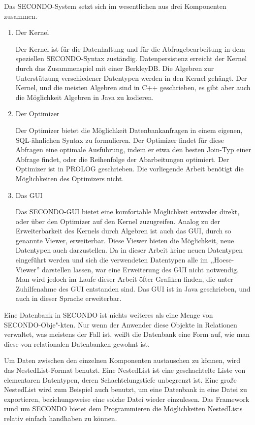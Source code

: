 Das SECONDO-System setzt sich im wesentlichen aus drei Komponenten zusammen.
\begin{enumerate}
\item Der Kernel

Der Kernel ist für die Datenhaltung und für die Abfragebearbeitung in dem speziellen SECONDO-Syntax zuständig. Datenpersistenz erreicht der Kernel durch das Zusammenspiel mit einer BerkleyDB. Die Algebren zur Unterstützung verschiedener Datentypen werden in den Kernel gehängt. Der Kernel, und die meisten Algebren sind in C++ geschrieben, es gibt aber auch die Möglichkeit Algebren in Java zu kodieren.

\item Der Optimizer

Der Optimizer bietet die Möglichkeit Datenbankanfragen in einem eigenen, SQL-ähnlichen Syntax zu formulieren. Der Optimizer findet für diese Abfragen eine optimale Ausführung, indem er etwa den besten Join-Typ einer Abfrage findet, oder die Reihenfolge der Abarbeitungen optimiert. Der Optimizer ist in PROLOG geschrieben. Die vorliegende Arbeit benötigt die Möglichkeiten des Optimizers nicht.

\item Das GUI

Das SECONDO-GUI bietet eine komfortable Möglichkeit entweder direkt, oder  über den Optimizer  auf den Kernel zuzugreifen. Analog zu der Erweiterbarkeit des Kernels durch Algebren ist auch das GUI, durch so genannte Viewer, erweiterbar. Diese Viewer bieten die Möglichkeit, neue Datentypen auch darzustellen. Da in dieser Arbeit keine neuen Datentypen eingeführt werden und sich die verwendeten Datentypen alle im ,,Hoese-Viewer'' darstellen lassen, war eine Erweiterung des GUI nicht notwendig. Man wird jedoch im Laufe dieser Arbeit öfter Grafiken finden, die unter Zuhilfenahme des GUI entstanden sind. Das GUI ist in Java geschrieben, und auch in dieser Sprache erweiterbar.

\end{enumerate}

Eine Datenbank in SECONDO ist nichts weiteres als eine Menge von SECONDO-Obje"-kten. Nur wenn der Anwender diese Objekte in Relationen verwaltet, was meistens der Fall ist, weißt die Datenbank eine Form auf, wie man diese von relationalen Datenbanken gewohnt ist.

Um Daten zwischen den einzelnen Komponenten austauschen zu können, wird das NestedList-Format benutzt. Eine NestedList ist eine geschachtelte Liste von elementaren Datentypen, deren Schachtelungstiefe unbegrenzt ist. Eine große NestedList wird zum Beispiel auch benutzt, um eine Datenbank in eine Datei zu exportieren, beziehungsweise eine solche Datei wieder einzulesen. Das Framework rund um SECONDO bietet dem Programmieren die Möglichkeiten NestedLists relativ einfach handhaben zu können.

